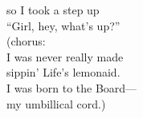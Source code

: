 \documentclass{article}
\begin{document}
\begin{center}
so I took a step up \\
``Girl, hey, what's up?'' \\ %
\vs
(chorus: \\
  I was never really made \\
  sippin' Life's lemonaid. \\
  I was born to the Board--- \\
  my umbillical cord.) \\
\vs
%
%

\end{center}
\end{document}
